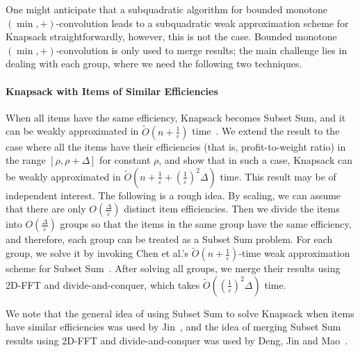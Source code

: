 \documentclass[a4paper,UKenglish,cleveref, autoref, thm-restate, pdfa]{lipics-v2021}
\newcommand{\eps}{\varepsilon}
\begin{document}
One might anticipate that a subquadratic algorithm for bounded monotone $(\min,+)$-convolution leads to a subquadratic weak approximation scheme for Knapsack straightforwardly, however, this is not the case. Bounded monotone $(\min,+)$-convolution is only used to merge results; the main challenge lies in dealing with each group, where we need the following two techniques.





\paragraph*{Knapsack with Items of Similar Efficiencies}
When all items have the same efficiency, Knapsack becomes Subset Sum, and it can be weakly approximated in $\tilde{O}(n + \frac{1}{\eps})$ time~\cite{CLMZ24cSTOCPartition}.  We extend the result to the case where all the items have their efficiencies (that is, profit-to-weight ratio) in the range $[\rho, \rho + \Delta]$ for constant $\rho$, and show that in such a case, Knapsack can be weakly approximated in $\tilde{O}(n + \frac{1}{\eps} + (\frac{1}{\eps})^2\Delta)$ time. This result may be of independent interest. The following is a rough idea. By scaling, we can assume that there are only $O(\frac{\Delta}{\eps})$ distinct item efficiencies. Then we divide the items into $O(\frac{\Delta}{\eps})$ groups so that the items in the same group have the same efficiency, and therefore, each group can be treated as a Subset Sum problem. For each group, we solve it by invoking Chen et al.'s $\tilde{O}(n + \frac{1}{\eps})$-time weak approximation scheme for Subset Sum~\cite{CLMZ24cSTOCPartition}. After solving all groups, we merge their results using 2D-FFT and divide-and-conquer, which takes $\tilde{O}((\frac{1}{\eps})^2 \Delta)$ time. 

We note that the general idea of using Subset Sum to solve Knapsack when items have similar efficiencies was used by Jin~\cite{Jin19}, and the idea of merging Subset Sum results using 2D-FFT and divide-and-conquer was used by Deng, Jin and Mao~\cite{DJM23}.
\end{document}

